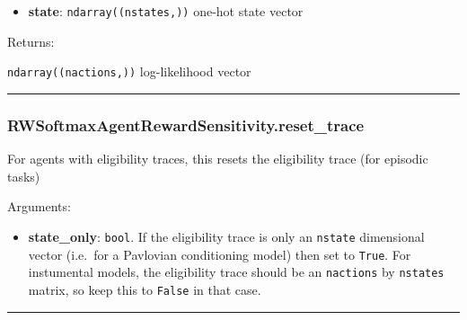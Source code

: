 \begin{itemize}
\tightlist
\item
  \textbf{state}: \texttt{ndarray((nstates,))} one-hot state vector
\end{itemize}

Returns:

\texttt{ndarray((nactions,))} log-likelihood vector

\begin{center}\rule{0.5\linewidth}{\linethickness}\end{center}

\subsubsection{RWSoftmaxAgentRewardSensitivity.reset\_trace}\label{rwsoftmaxagentrewardsensitivity.reset_trace}

\begin{Shaded}
\begin{Highlighting}[]
\OperatorTok{=}\NormalTok{)}
\end{Highlighting}
\end{Shaded}

For agents with eligibility traces, this resets the eligibility trace
(for episodic tasks)

Arguments:

\begin{itemize}
\tightlist
\item
  \textbf{state\_only}: \texttt{bool}. If the eligibility trace is only
  an \texttt{nstate} dimensional vector (i.e.~for a Pavlovian
  conditioning model) then set to \texttt{True}. For instumental models,
  the eligibility trace should be an \texttt{nactions} by
  \texttt{nstates} matrix, so keep this to \texttt{False} in that case.
\end{itemize}

\begin{center}\rule{0.5\linewidth}{\linethickness}\end{center}
